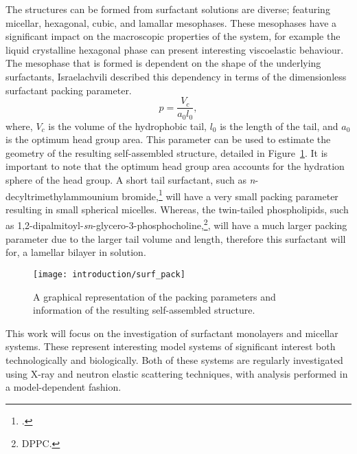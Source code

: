 The structures can be formed from surfactant solutions are diverse; featuring micellar, hexagonal, cubic, and lamallar mesophases.
These mesophases have a significant impact on the macroscopic properties of the system, for example the liquid crystalline hexagonal phase can present interesting viscoelastic behaviour.\autocite{jurasin_lamellar_2013,cordobes_linear_1997}
The mesophase that is formed is dependent on the shape of the underlying surfactants, Israelachvili described this dependency in terms of the dimensionless surfactant packing parameter.\cite{israelachvili_intermolecular_2011}
%
\begin{equation}
p = \frac{V_c}{a_0l_0},
\end{equation}
%
where, $V_c$ is the volume of the hydrophobic tail, $l_0$ is the length of the tail, and $a_0$ is the optimum head group area.
This parameter can be used to estimate the geometry of the resulting self-assembled structure, detailed in Figure~\ref{fig:pack}.
It is important to note that the optimum head group area accounts for the hydration sphere of the head group.
A short tail surfactant, such as \emph{n}-decyltrimethylammounium bromide,\footnote{.} will have a very small packing parameter resulting in small spherical micelles.
Whereas, the twin-tailed phospholipids, such as 1,2-dipalmitoyl-\emph{sn}-glycero-3-phosphocholine,\footnote{DPPC.}, will have a much larger packing parameter due to the larger tail volume and length, therefore this surfactant will for, a lamellar bilayer in solution.
%
\begin{figure}
    \centering
    \texttt{[image: introduction/surf\_pack]}
    \caption{A graphical representation of the packing parameters and information of the resulting self-assembled structure.}
    \label{fig:pack}
\end{figure}
%

This work will focus on the investigation of surfactant monolayers and micellar systems.
These represent interesting model systems of significant interest both technologically\autocite{anton_reverse_2010,zagnoni_miniaturised_2012} and biologically.\autocite{kataoka_block_2012,mohwald_phospholipid_1990,kewalramani_effects_2010}
Both of these systems are regularly investigated using X-ray and neutron elastic scattering techniques, with analysis performed in a model-dependent fashion.\autocite{pambou_structural_2015,hayward_liquid_2015,rodriguez-loureiro_neutron_2017,hazell_langmuir_2016}
